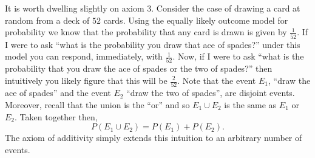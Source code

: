 \documentclass[
  letterpaper,
  DIV=11,
  numbers=noendperiod]{scrreprt}
\theoremstyle{definition}
\theoremstyle{definition}
\theoremstyle{definition}
\theoremstyle{remark}
\begin{document}
It is worth dwelling slightly on axiom 3. Consider the case of drawing a
card at random from a deck of \(52\) cards. Using the equally likely
outcome model for probability we know that the probability that any card
is drawn is given by \(\frac{1}{52}\). If I were to ask ``what is the
probability you draw that ace of spades?'' under this model you can
respond, immediately, with \(\frac{1}{52}\). Now, if I were to ask
``what is the probability that you draw the ace of spades or the two of
spades?'' then intuitively you likely figure that this will be
\(\frac{2}{52}\). Note that the event \(E_1\), ``draw the ace of
spades'' and the event \(E_2\) ``draw the two of spades'', are disjoint
events. Moreover, recall that the union is the ``or'' and so
\(E_1\cup E_2\) is the same as \(E_1\) or \(E_2\). Taken together then,
\[P(E_1\cup E_2) = P(E_1) + P(E_2).\] The axiom of additivity simply
extends this intuition to an arbitrary number of events.
\end{document}
